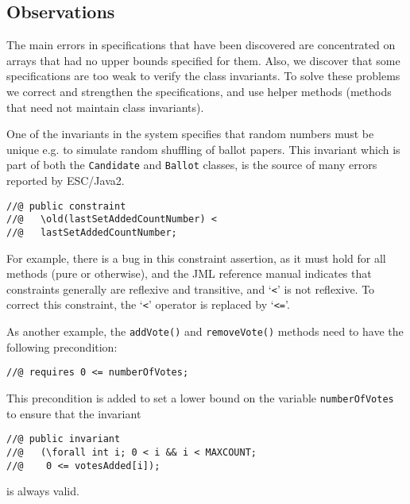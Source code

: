 \documentclass[letterpaper,twocolumn,10pt]{article}
\begin{document}
\subsection{Observations}

The main errors in specifications that have been discovered are
concentrated on arrays that had no upper bounds specified for them.
Also, we discover that some specifications are too weak to verify the 
class invariants. To solve these problems we correct and strengthen
the specifications, and use helper methods (methods that need not maintain
class invariants).

One of the invariants in the system specifies that random numbers must be 
unique e.g. to simulate random shuffling of ballot papers.  This invariant which
is part of both the \texttt{Candidate} and \texttt{Ballot}
classes, is the source of many errors reported by ESC/Java2.


{\footnotesize
\begin{verbatim}
//@ public constraint
//@   \old(lastSetAddedCountNumber) <
//@   lastSetAddedCountNumber;
\end{verbatim}
}

For example, there is a bug in this constraint assertion, as it must
hold for all methods (pure or otherwise), and the JML reference manual
indicates that constraints generally are reflexive and transitive, and
`\texttt{<}' is not reflexive.  To correct this constraint, the
`\texttt{<}' operator is replaced by `\texttt{<=}'.

As another example, the \texttt{addVote()} and \texttt{removeVote()}
methods need to have the following precondition:
{\footnotesize
\begin{verbatim}
//@ requires 0 <= numberOfVotes;
\end{verbatim}
}
This precondition is added to set a lower bound on the variable
\texttt{numberOfVotes} to ensure that the invariant
{\footnotesize
\begin{verbatim}
//@ public invariant
//@   (\forall int i; 0 < i && i < MAXCOUNT;
//@    0 <= votesAdded[i]);  
\end{verbatim}
}
is always valid.
\end{document}
